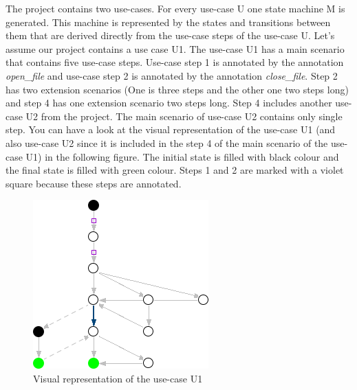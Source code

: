 The project contains two use-cases. For every use-case U one state machine M is generated. This machine is represented by the states and
transitions between them that are derived directly from the use-case steps of the use-case U. Let's assume our project contains a use
case U1. The use-case U1 has a main scenario that contains five use-case steps. Use-case step 1 is annotated by the annotation \emph{open\_file}
and use-case step 2 is annotated by the annotation \emph{close\_file}. Step 2 has two extension scenarios (One is three steps and the other
one two steps long) and step 4 has one extension scenario two steps long. Step 4 includes another use-case U2 from the project. The
main scenario of use-case U2 contains only single step. You can have a look at the visual representation of the use-case U1 (and also
use-case U2 since it is included in the step 4 of the main scenario of the use-case U1) in the following figure. The initial state is
filled with black colour and the final state is filled with green colour. Steps 1 and 2 are marked with a violet square because these
steps are annotated.

\begin{figure}[h]
  \centering
  \includegraphics{images/uc1}
  \caption{Visual representation of the use-case U1}
  \label{fig:use-case U1}
\end{figure}

